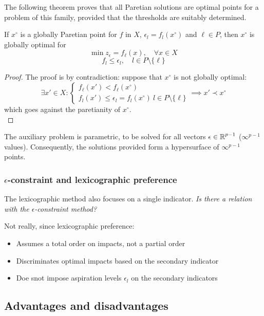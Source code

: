 The following theorem proves that all Paretian solutions are optimal points for a problem of this family, provided that the thresholds are suitably determined. \\

\begin{theo}
	If $x^\circ$ is a globally Paretian point for $f$ in $X$, $\epsilon_l = f_l (x^\circ)$ and $\ell \in P$, then $x^\circ$ is globally optimal for
	$$ \min z_\epsilon = f_\ell (x), \quad \forall x \in X $$
	$$ f_l \leq \epsilon_l, \quad l \in P \setminus \{\ell\}$$
\end{theo}
\begin{proof}
	The proof is by contradiction: suppose that $x^\circ$ is not globally optimal:
	$$ \exists x' \in X : \begin{cases}
		f_\ell (x') < f_\ell (x^\circ) \\
		f_l (x') \leq \epsilon_l = f_l (x^\circ) \ l \in P \setminus \{\ell\}
	\end{cases} \implies x' \prec x^\circ $$
	which goes against the paretianity of $x^\circ$. \\
\end{proof}

The auxiliary problem is parametric, to be solved for all vectors $\epsilon \in \operatorname{\mathbb{R}}^{p-1}$ ($\infty^{p-1}$ values). Consequently, the solutions provided form a hypersurface of $\infty^{p-1}$ points.

\subsubsection{$\epsilon$-constraint and lexicographic preference}

The lexicographic method also focuses on a single indicator. \textit{Is there a relation with the $\epsilon$-constraint method?}

Not really, since lexicographic preference: 
\begin{itemize}
	\item Assumes a total order on impacts, not a partial order
	
	\item Discriminates optimal impacts based on the secondary indicator
	
	\item Doe snot impose aspiration levels $\epsilon_l$ on the secondary indicators
\end{itemize}

\subsection{Advantages and disadvantages}

